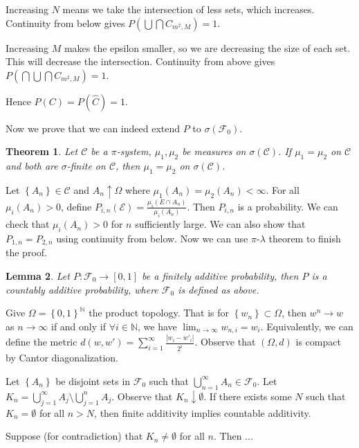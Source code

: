 \documentclass[11pt]{article}
\newtheorem{thm}{Theorem}[section]
\newtheorem{lemma}[thm]{Lemma}
\theoremstyle{definition}
\newcommand{\sm}[0]{\setminus}
\newcommand{\set}[1]{\left\{ #1 \right\}}
\newcommand{\abs}[1]{\left\lvert#1\right\rvert} %
\newcommand{\NN}{\mathbb{N}}
\newcommand{\m}[1]{\mathcal{#1}}
\begin{document}
Increasing $N$ means we take the intersection of less sets, which increases.  Continuity
from below gives $P(\bigcup\bigcap{C_{m^2,M}})=1$. 

Increasing $M$ makes the epsilon smaller, so we are decreasing the size of each set. This
will decrease the intersection.  Continuity from above gives
$P(\bigcap\bigcup\bigcap{C_{m^2,M}})=1$. 

Hence $P(C)=P(\hat{C})=1$. 
\qedhere



Now we prove that we can indeed extend $P$ to $\sigma(\m{F}_0)$. 

\begin{thm}
    Let $\m{C}$ be a $\pi$-system, $\mu_1, \mu_2$ be measures on $\sigma(\m{C})$. If
    $\mu_1=\mu_2$ on $\m{C}$ and both are $\sigma$-finite on $\m{C}$, then $\mu_1=\mu_2$ on
    $\sigma(\m{C})$. 
\end{thm}
\proof
Let $\set{A_n}\in\m{C}$ and $A_n\uparrow\Omega$ where $\mu_1(A_n)=\mu_2(A_n)<\infty$. For
all $\mu_i(A_n) > 0$, define $P_{i,n}(\m{E}) = \frac{\mu_i(E\cap A_n)}{\mu_i(A_n)}$. Then
$P_{i,n}$ is a probability. We can check that $\mu_i(A_n)>0$ for $n$ sufficiently large. We
can also show that $P_{1,n}=P_{2,n}$ using continuity from below. Now we can use
$\pi$-$\lambda$ theorem to finish the proof. 
\qedhere

\begin{lemma}
    Let $P:\m{F}_0\to[0,1]$ be a finitely additive probability, then $P$ is a countably
    additive probability, where $\m{F}_0$ is defined as above.
\end{lemma}
\proof
Give $\Omega=\set{0,1}^\NN$ the product topology. That is for $\set{w_n}\subset\Omega$,
then $w^n\to w$ as $n\to\infty$ if and only if $\forall i\in\NN$, we have
$\lim_{n\to\infty} w_{n,i}=w_i$. Equivalently, we can define the metric $d(w,w') =
\sum_{i=1}^\infty \frac{\abs{w_i-w'_i}}{2^i}$. Observe that $(\Omega,d)$ is compact by
Cantor diagonalization. 

Let $\set{A_n}$ be disjoint sets in $\m{F}_0$ such that $\bigcup_{n=1}^\infty
A_n\in\m{F}_0$. Let $K_n=\bigcup_{j=1}^\infty A_j \sm \bigcup_{j=1}^n A_j$. Observe that
$K_n\downarrow\emptyset$. If there exists some $N$ such that $K_n=\emptyset$ for all $n>N$,
then finite additivity implies countable additivity. 

Suppose (for contradiction) that $K_n\neq\emptyset$ for all $n$. Then ...
\qedhere
\end{document}
